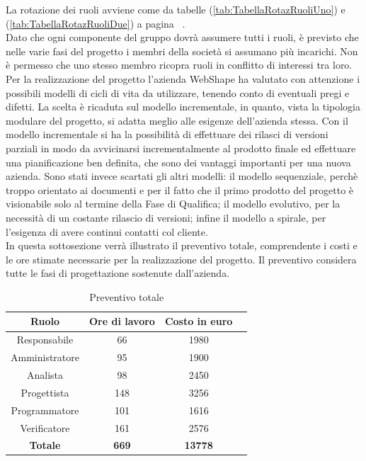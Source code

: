 La rotazione dei ruoli avviene come da tabelle (\ref{tab:TabellaRotazRuoliUno}) e (\ref{tab:TabellaRotazRuoliDue}) a pagina ~\pageref{tab:TabellaRotazRuoliUno}.\\
Dato che ogni componente del gruppo dovr\`a assumere tutti i ruoli, \`e previsto che nelle varie fasi del progetto i membri della societ\`a si assumano pi\`u incarichi. Non \`e permesso che uno stesso membro ricopra ruoli in conflitto di interessi tra loro.\\

Per la realizzazione del progetto l'azienda WebShape ha valutato con attenzione i possibili modelli di cicli di vita da utilizzare, tenendo conto di eventuali pregi e difetti. 
La scelta \`e ricaduta sul modello incrementale, in quanto, vista la tipologia modulare del progetto, si adatta meglio alle esigenze dell'azienda stessa. Con il modello incrementale si ha la possibilit\`a di effettuare dei rilasci di versioni parziali in modo da avvicinarsi incrementalmente al prodotto finale ed effettuare una pianificazione ben definita, che sono dei vantaggi importanti per una nuova azienda. Sono stati invece scartati gli altri modelli: il modello sequenziale, perch\`e troppo orientato ai documenti e per il fatto che il primo prodotto del progetto \`e visionabile solo al termine della Fase di Qualifica; il modello evolutivo, per la necessit\`a di un costante rilascio di versioni; infine il modello a spirale, per l'esigenza di avere continui contatti col cliente.\\
In questa sottosezione verr\` a illustrato il preventivo totale, comprendente i costi e le ore stimate necessarie per la realizzazione del progetto. Il preventivo considera tutte le fasi di progettazione sostenute dall'azienda.

\begin{table}[h]
	\begin{center}
		  \begin{tabular}{|c|c|c|c|}
		 \hline 
		 \textbf{Ruolo} & \textbf{Ore di lavoro} & \textbf{Costo in euro}\\
		 \hline
		Responsabile & 66 & 1980 \\
		Amministratore & 95 & 1900\\
		Analista & 98 & 2450\\
		Progettista & 148 & 3256\\
		Programmatore & 101 & 1616 \\
		Verificatore & 161 & 2576\\
        \hline
        \textbf{Totale} & \textbf{669} & \textbf{13778}\\
		\hline
		\end{tabular}
	\caption{Preventivo totale} 
	\label{tab:tabella_preventivo}
	\end{center}	
\end{table}

